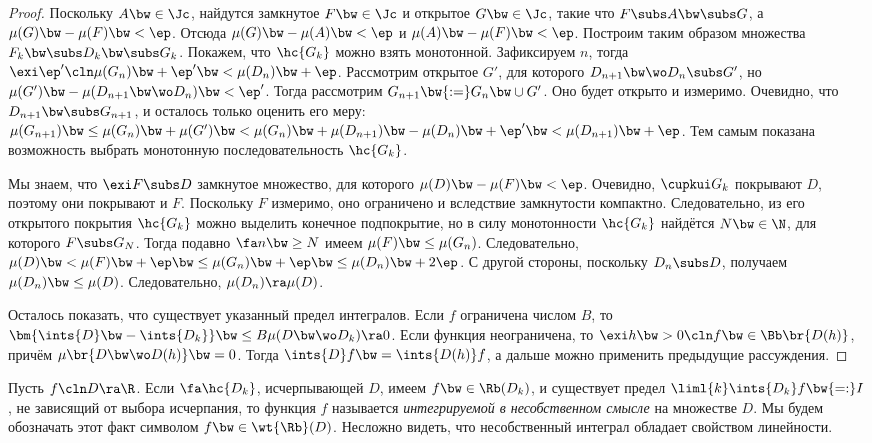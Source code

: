 \documentclass[a4paper]{article}
\newcommand{\Rbt}{\wt{\Rb}}
\begin{document}
\begin{proof}
Поскольку $A \bw\in \Jc$, найдутся замкнутое $F \bw\in \Jc$ и открытое $G \bw\in \Jc$, такие что $F \subs A
\bw\subs G$, а $\mu(G) \bw- \mu(F) \bw< \ep$. Отсюда $\mu(G) \bw- \mu(A) \bw< \ep$ и $\mu(A) \bw-
\mu(F) \bw< \ep$. Построим таким образом множества $F_k \bw\subs D_k \bw\subs G_k$. Покажем, что
$\hc{G_k}$ можно взять монотонной. Зафиксируем $n$, тогда $\exi \ep'\cln \mu(G_n) \bw+ \ep' \bw<
\mu(D_n) \bw+ \ep$. Рассмотрим открытое $G'$, для которого $D_{n+1}\bw\wo D_n \subs G'$, но
$\mu(G') \bw- \mu(D_{n+1} \bw\wo D_n) \bw< \ep'$. Тогда рассмотрим $G_{n+1} \bw{:=} G_n \bw\cup
G'$. Оно будет открыто и измеримо. Очевидно, что $D_{n+1} \bw\subs G_{n+1}$, и осталось только
оценить его меру: $\mu(G_{n+1}) \bw\le \mu(G_n) \bw+ \mu(G') \bw< \mu(G_n) \bw+ \mu(D_{n+1}) \bw-
\mu(D_n) \bw+ \ep' \bw< \mu(D_{n+1}) \bw+ \ep$. Тем самым показана возможность выбрать монотонную
последовательность $\hc{G_k}$.

Мы знаем, что $\exi F \subs D$ замкнутое множество, для которого $\mu(D) \bw- \mu(F) \bw< \ep$.
Очевидно, $\cupkui G_k$ покрывают $D$, поэтому они покрывают и $F$. Поскольку $F$ измеримо, оно
ограничено и вследствие замкнутости компактно. Следовательно, из его открытого покрытия $\hc{G_k}$
можно выделить конечное подпокрытие, но в силу монотонности $\hc{G_k}$ найдётся $N \bw\in \N$, для
которого $F \subs G_N$. Тогда подавно $\fa n \bw\ge N$ имеем $\mu(F) \bw\le \mu(G_n)$. Следовательно,
$\mu(D) \bw< \mu(F) \bw+ \ep \bw\le \mu(G_n) \bw+ \ep \bw\le \mu(D_n) \bw+ 2\ep$. С другой стороны, поскольку $D_n
\subs D$, получаем $\mu(D_n) \bw\le \mu(D)$. Следовательно, $\mu(D_n) \ra \mu(D)$.

Осталось показать, что существует указанный предел интегралов. Если $f$ ограничена числом $B$, то
$\bm{\ints{D} \bw- \ints{D_k}} \bw\le B\mu(D\bw\wo D_k) \ra 0$. Если функция неограничена, то $\exi h \bw>0\cln
f \bw\in \Bb\br{D(h)}$, причём $\mu\br{D \bw\wo D(h)} \bw= 0$. Тогда $\ints{D} f \bw= \ints{D(h)}f$, а дальше
можно применить предыдущие рассуждения.
\end{proof}

\begin{df}
Пусть $f\cln D\ra \R$. Если $\fa \hc{D_k}$, исчерпывающей $D$, имеем $f \bw\in \Rb(D_k)$, и существует
предел $\liml{k} \ints{D_k} f \bw{=:} I$, не зависящий от выбора исчерпания, то функция $f$
называется \emph{интегрируемой в несобственном смысле} на множестве $D$. Мы будем обозначать этот
факт символом $f \bw\in \Rbt(D)$. Несложно видеть, что несобственный интеграл обладает свойством
линейности.
\end{df}
\end{document}
